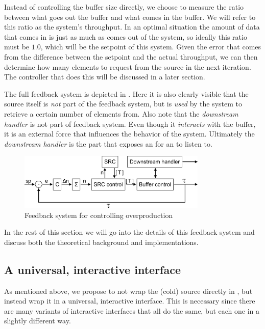 Instead of controlling the buffer size directly, we choose to measure the ratio between what goes out the buffer and what comes in the buffer. We will refer to this ratio as the system's throughput. In an optimal situation the amount of data that comes in is just as much as comes out of the system, so ideally this ratio must be $1.0$, which will be the setpoint of this system. Given the error that comes from the difference between the setpoint and the actual throughput, we can then determine how many elements to request from the source in the next iteration. The controller that does this will be discussed in a later section.

The full feedback system is depicted in . Here it is also clearly visible that the source itself is \emph{not} part of the feedback system, but is \emph{used} by the system to retrieve a certain number of elements from. Also note that the \textit{downstream handler} is not part of feedback system. Even though it \emph{interacts} with the buffer, it is an external force that influences the behavior of the system. Ultimately the \textit{downstream handler} is the part that exposes an \obs for an \obv to listen to.

\begin{figure}[H]
	\begin{center}
		\includegraphics[width=0.8\textwidth]{figures/Backpressure-feedback-system.png}
	\end{center}
	\caption{Feedback system for controlling overproduction}
	\label{fig:backpressure-feedback-system}
\end{figure}

In the rest of this section we will go into the details of this feedback system and discuss both the theoretical background and implementations.

\subsection{A universal, interactive interface}
As mentioned above, we propose to not wrap the (cold) source directly in , but instead wrap it in a universal, interactive interface. This is necessary since there are many variants of interactive interfaces that all do the same, but each one in a slightly different way.

